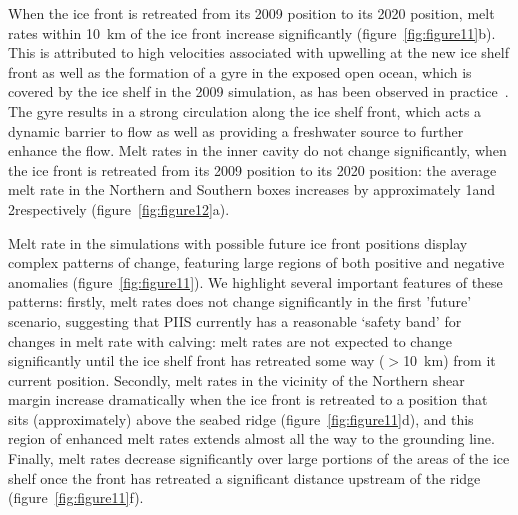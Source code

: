 \documentclass[draft]{agujournal2019}
\begin{document}
When the ice front is retreated from its 2009 position to its 2020 position, melt rates within 10~km of the ice front increase significantly (figure~\ref{fig:figure11}b). This is attributed to high velocities associated with upwelling at the new ice shelf front as well as the formation of a gyre in the exposed open ocean, which is covered by the ice shelf in the 2009 simulation, as has been observed in practice~\cite{Yoon2021}. The gyre results in a strong circulation along the ice shelf front, which acts a dynamic barrier to flow as well as providing a freshwater source to further enhance the flow. Melt rates in the inner cavity do not change significantly, when the ice front is retreated from its 2009 position to its 2020 position: the average melt rate in the Northern and Southern boxes increases by approximately 1\mpryr and 2\mpryr respectively (figure~\ref{fig:figure12}a).

Melt rate in the simulations with possible future ice front positions display complex patterns of change, featuring large regions of both positive and negative anomalies (figure~\ref{fig:figure11}). We highlight several important features of these patterns: firstly, melt rates does not change significantly in the first 'future' scenario, suggesting that PIIS currently has a reasonable `safety band' for changes in melt rate with calving: melt rates are not expected to change significantly until the ice shelf front has retreated some way ($>$10~km) from it current position. Secondly, melt rates in the vicinity of the Northern shear margin increase dramatically when the ice front is retreated to a position that sits (approximately) above the seabed ridge (figure~\ref{fig:figure11}d), and this region of enhanced melt rates extends almost all the way to the grounding line.  Finally, melt rates decrease significantly over large portions of the areas of the ice shelf once the front has retreated a significant distance upstream of the ridge (figure~\ref{fig:figure11}f).
\end{document}
